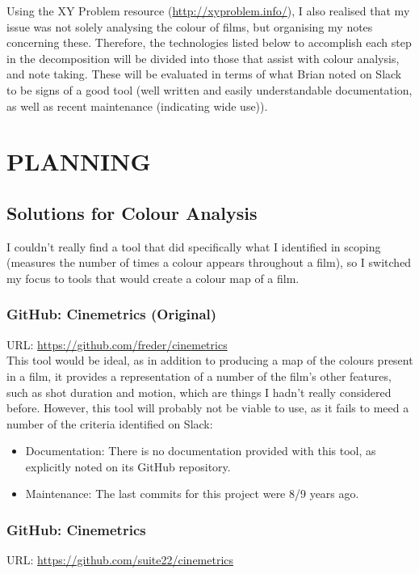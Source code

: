 \documentclass{article}
\begin{document}
Using the XY Problem resource (\url{http://xyproblem.info/}), I also realised that my issue was not solely analysing the colour of films, but organising my notes concerning these. Therefore, the technologies listed below to accomplish each step in the decomposition will be divided into those that assist with colour analysis, and note taking. These will be evaluated in terms of what Brian noted on Slack to be signs of a good tool (well written and easily understandable documentation, as well as recent maintenance (indicating wide use)).

\section{PLANNING}

\subsection{Solutions for Colour Analysis}
I couldn't really find a tool that did specifically what I identified in scoping (measures the number of times a colour appears throughout a film), so I switched my focus to tools that would create a colour map of a film.

\subsubsection{GitHub: Cinemetrics (Original)}
URL: \url{https://github.com/freder/cinemetrics}\\

This tool would be ideal, as in addition to producing a map of the colours present in a film, it provides a representation of a number of the film's other features, such as shot duration and motion, which are things I hadn't really considered before. However, this tool will probably not be viable to use, as it fails to meed a number of the criteria identified on Slack: 
\begin{itemize}
    \item Documentation: There is no documentation provided with this tool, as explicitly noted on its GitHub repository.
    \item Maintenance: The last commits for this project were 8/9 years ago.
\end{itemize}

\subsubsection{GitHub: Cinemetrics}
URL: \url{https://github.com/suite22/cinemetrics}\\
\end{document}
